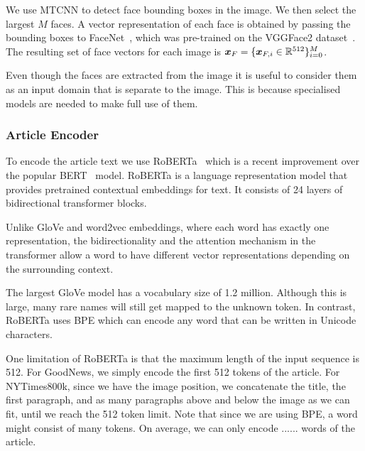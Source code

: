 We use MTCNN \cite{Zhang2016JointFD} to detect face bounding boxes in the
image. We then select the largest $M$ faces. A vector representation of each
face is obtained by passing the bounding boxes to
FaceNet~\cite{Schroff2015FaceNetAU}, which was pre-trained on the VGGFace2
dataset~\cite{Cao2017VGGFace2AD}. The resulting set of face vectors for each
image is $\bm{x}_{F} = \{\bm{x}_{F,i} \in \mathbb{R}^{512}\}_{i=0}^M$.

Even though the faces are extracted from the image it is useful to consider
them as an input domain that is separate to the image. This is because
specialised models are needed to make full use of them.



\subsubsection{Article Encoder}

To encode the article text we use RoBERTa~\cite{Liu2019RoBERTaAR} which is a
recent improvement over the popular BERT~\cite{Devlin2019BERT} model.
RoBERTa is a language representation model that provides pretrained contextual
embeddings for text. It consists of 24 layers of bidirectional transformer
blocks.

Unlike GloVe \cite{Pennington2014Glove} and word2vec
\cite{Mikolov2013DistributedRO} embeddings, where each word has exactly one
representation, the bidirectionality and the attention mechanism in the
transformer allow a word to have different vector representations depending on
the surrounding context.

The largest GloVe model has a vocabulary size of 1.2 million. Although this is
large, many rare names will still get mapped to the unknown token. In contrast,
RoBERTa uses BPE \cite{Sennrich2015NeuralMT,Radford2019LanguageMA} which can
encode any word that can be written in Unicode characters.

One limitation of RoBERTa is that the maximum length of the input sequence is
512. For GoodNews, we simply encode the first 512 tokens of the article. For
NYTimes800k, since we have the image position, we concatenate the title, the
first paragraph, and as many paragraphs above and below the image as we can
fit, until we reach the 512 token limit. Note that since we are using BPE, a
word might consist of many tokens. On average, we can only encode ...... words
of the article.

